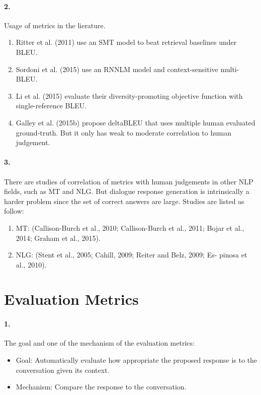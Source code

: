 \documentclass[runningheads]{llncs}
\begin{document}
\paragraph{2.} Usage of metrics in the lierature.
\begin{enumerate}
    \item Ritter et al. (2011) use an SMT model to beat retrieval baselines
    under BLEU.
    \item Sordoni et al. (2015) use an RNNLM model and context-sensitive multi-BLEU.
    \item Li et al. (2015) evaluate their diversity-promoting objective function
    with single-reference BLEU.
    \item Galley et al. (2015b) propose deltaBLEU that uses multiple human evaluated
    ground-truth. But it only has weak to moderate correlation to human judgement.
\end{enumerate}

\paragraph{3.} There are studies
of correlation of metrics with human judgements in other NLP fields,
such as MT and NLG. But dialogue response generation is intrinsically
a harder problem since the set of correct answers are large.
Studies are listed as follow:
\begin{enumerate}
    \item MT: (Callison-Burch et al., 2010; Callison-Burch et al.,
2011; Bojar et al., 2014; Graham et al., 2015).
    \item NLG: (Stent et
al., 2005; Cahill, 2009; Reiter and Belz, 2009; Es-
pinosa et al., 2010).
\end{enumerate}

\section{Evaluation Metrics}
\paragraph{1.} The goal and one of the mechanism of the evaluation metrics:
\begin{itemize}
    \item Goal: Automatically evaluate how appropriate the proposed response
    is to the conversation given its context.
    \item Mechanism: Compare the response to the conversation.
\end{itemize}
\end{document}
